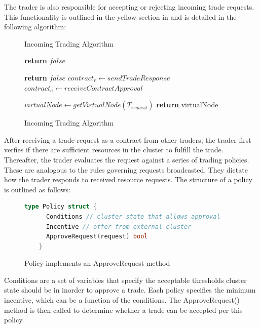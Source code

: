 The trader is also responsible for accepting or rejecting incoming trade
requests. This functionality is outlined in the yellow section in 
and is detailed in the following algorithm: 

\begin{figure}[H]
\begin{algorithm}[H]
\caption{Incoming Trading Algorithm}
\begin{algorithmic}
   
    
     
      \State \textbf{return} $false$ 
    \EndIf

      \State \textbf{return} $false$ 
      \EndIf
    \EndFor
    \State $contract_r \gets sendTradeResponse$ 
    \State $contract_a \gets receiveContractApproval$ 

    \State $virtualNode \gets getVirtualNode(T_{request})$     
    \State \textbf{return} virtualNode 
  \EndProcedure
\end{algorithmic}
\end{algorithm}
\caption{Incoming Trading Algorithm}
\end{figure}

After receiving a trade request as a contract from other traders, the trader
first verfies if there are sufficient resources in the cluster to fulfill the
trade. Thereafter, the trader evaluates the request against a series of trading
policies. These are analogous to the rules governing requests broadcasted. They
dictate how the trader responds to received resource requests. The structure of
a policy is outlined as follows:

\begin{figure}[H]
  \begin{lstlisting}[language=go]
    type Policy struct {
      Conditions // cluster state that allows approval
      Incentive // offer from external cluster
      ApproveRequest(request) bool 
    } 
  \end{lstlisting}
  \caption{Policy implements an ApproveRequest method}
\end{figure}

Conditions are a set of variables that specify the acceptable thresholds
cluster state should be in inorder to approve a trade. Each policy specifies
the minimum incentive, which can be a function of the conditions. The
ApproveRequest() method is then called to determine whether a trade can be
accepted per this policy.

